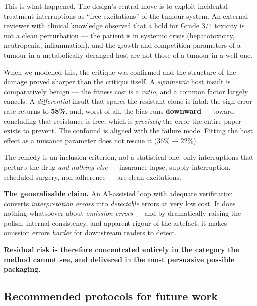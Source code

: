 \documentclass[11pt,a4paper]{article}
\begin{document}
This is what happened. The design's central move is to exploit incidental treatment
interruptions as ``free excitations'' of the tumour system. An external reviewer with
clinical knowledge observed that a hold for Grade 3/4 toxicity is not a clean
perturbation --- the patient is in systemic crisis (hepatotoxicity, neutropenia,
inflammation), and the growth and competition parameters of a tumour in a metabolically
deranged host are not those of a tumour in a well one.

When we modelled this, the critique was confirmed and the structure of the damage proved
sharper than the critique itself. A \emph{symmetric} host insult is comparatively benign
--- the fitness cost is a \emph{ratio}, and a common factor largely cancels. A
\emph{differential} insult that spares the resistant clone is fatal: the sign-error rate
returns to \textbf{58\%}, and, worst of all, the bias runs \textbf{downward} --- toward
concluding that resistance is free, which is \emph{precisely} the error the entire paper
exists to prevent. The confound is aligned with the failure mode. Fitting the host effect
as a nuisance parameter does not rescue it ($36\% \to 22\%$).

The remedy is an inclusion criterion, not a statistical one: only interruptions that
perturb the drug \emph{and nothing else} --- insurance lapse, supply interruption,
scheduled surgery, non-adherence --- are clean excitations.

\begin{tcolorbox}[keybox]
\textbf{The generalisable claim.} An AI-assisted loop with adequate verification
converts \emph{interpretation errors} into \emph{detectable} errors at very low cost.
It does nothing whatsoever about \emph{omission errors} --- and by dramatically raising
the polish, internal consistency, and apparent rigour of the artefact, it makes
omission errors \emph{harder} for downstream readers to detect.

\textbf{Residual risk is therefore concentrated entirely in the category the method
cannot see, and delivered in the most persuasive possible packaging.}
\end{tcolorbox}

\subsection{Recommended protocols for future work}
\end{document}
